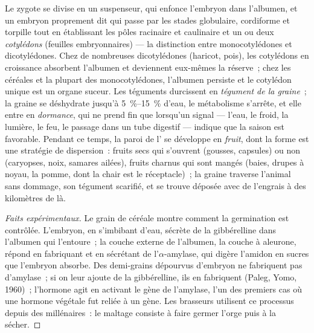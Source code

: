 \begin{definition}\label{def:b2:angiosperm-reproduction:seed}
Le zygote se divise en un suspenseur, qui enfonce l'embryon dans
l'albumen, et un embryon proprement dit qui passe par les stades
globulaire, cordiforme et torpille tout en établissant les pôles
racinaire et caulinaire et un ou deux \emph{cotylédons} (feuilles
embryonnaires) --- la distinction entre monocotylédones et
dicotylédones. Chez de nombreuses dicotylédones (haricot, pois), les
cotylédons en croissance absorbent l'albumen et deviennent eux-mêmes la
réserve~; chez les céréales et la plupart des monocotylédones,
l'albumen persiste et le cotylédon unique est un organe suceur. Les
téguments durcissent en \emph{tégument de la graine}~; la graine se
déshydrate jusqu'à \qtyrange{5}{15}{\%} d'eau, le métabolisme
s'arrête, et elle entre en \emph{dormance}, qui ne prend fin que
lorsqu'un signal --- l'eau, le froid, la lumière, le feu, le passage
dans un tube digestif --- indique que la saison est favorable.
Pendant ce temps, la paroi de l' se développe en \emph{fruit},
dont la forme est une stratégie de dispersion~: fruits secs qui
s'ouvrent (gousses, capsules) ou non (caryopses, noix, samares ailées),
fruits charnus qui sont mangés (baies, drupes à noyau, la pomme, dont la
chair est le réceptacle)~; la graine traverse l'animal sans dommage, son
tégument scarifié, et se trouve déposée avec de l'engrais à des
kilomètres de là.
\end{definition}
\begin{proof}[Faits expérimentaux]
Le grain de céréale montre comment la germination est contrôlée.
L'embryon, en s'imbibant d'eau, sécrète de la gibbérelline dans
l'albumen qui l'entoure~; la couche externe de l'albumen, la couche à
aleurone, répond en fabriquant et en sécrétant de l'$\alpha$-amylase,
qui digère l'amidon en sucres que l'embryon absorbe. Des demi-grains
dépourvus d'embryon ne fabriquent pas d'amylase~; si on leur ajoute de
la gibbérelline, ils en fabriquent (Paleg, Yomo, 1960)~; l'hormone agit
en activant le gène de l'amylase, l'un des premiers cas où une hormone
végétale fut reliée à un gène. Les brasseurs utilisent ce processus
depuis des millénaires~: le maltage consiste à faire germer l'orge puis
à la sécher.
\end{proof}

